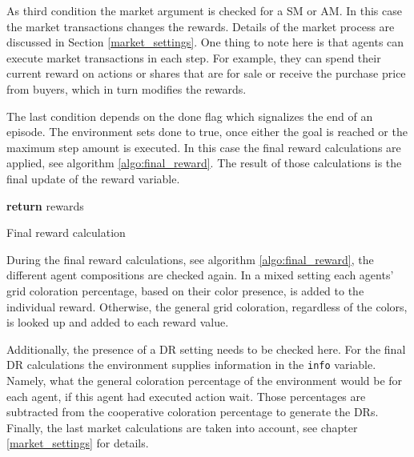 As third condition the market argument is checked for a SM or AM. In this case the market transactions changes the rewards. Details of the market process are discussed in Section \ref{market_settings}. One thing to note here is that agents can execute market transactions in each step. For example, they can spend their current reward on actions or shares that are for sale or receive the purchase price from buyers, which in turn modifies the rewards.

The last condition depends on the done flag which signalizes the end of an episode. The environment sets done to true, once either the goal is reached or the maximum step amount is executed. In this case the final reward calculations are applied, see algorithm \ref{algo:final_reward}. The result of those calculations is the final update of the reward variable.

\begin{algorithm}[H]
    \DontPrintSemicolon
    \;
    \;
    \textbf{return} rewards\;
    \caption{Final reward calculation}\label{algo:final_reward}
\end{algorithm}

During the final reward calculations, see algorithm \ref{algo:final_reward}, the different agent compositions are checked again. In a mixed setting each agents' grid coloration percentage, based on their color presence, is added to the individual reward. Otherwise, the general grid coloration, regardless of the colors, is looked up and added to each reward value. 

Additionally, the presence of a DR setting needs to be checked here. For the final DR calculations the environment supplies information in the \verb|info| variable. Namely, what the general coloration percentage of the environment would be for each agent, if this agent had executed action wait. Those percentages are subtracted from the cooperative coloration percentage to generate the DRs. Finally, the last market calculations are taken into account, see chapter \ref{market_settings} for details.

